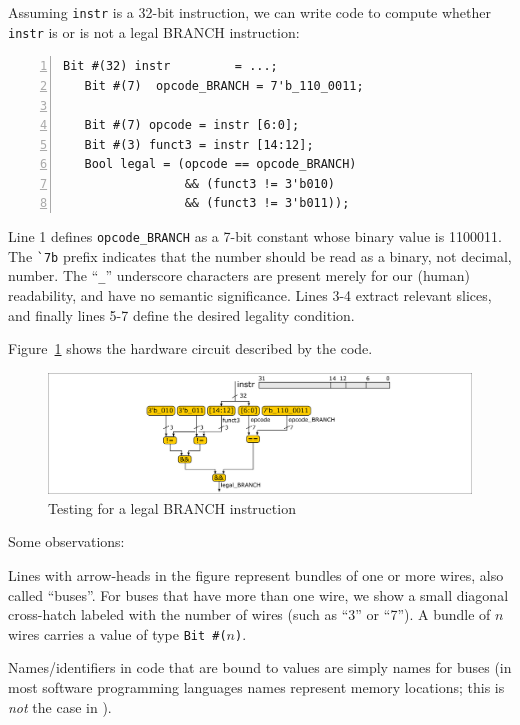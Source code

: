 Assuming \verb|instr| is a 32-bit instruction, we can write {\BSV} code
to compute whether \verb|instr| is or is not a legal BRANCH
instruction:

{\footnotesize
\begin{Verbatim}[frame=single, numbers=left]
   Bit #(32) instr         = ...;
   Bit #(7)  opcode_BRANCH = 7'b_110_0011;

   Bit #(7) opcode = instr [6:0];
   Bit #(3) funct3 = instr [14:12];
   Bool legal = (opcode == opcode_BRANCH)
                 && (funct3 != 3'b010)
                 && (funct3 != 3'b011));
\end{Verbatim}
}

Line 1 defines \verb|opcode_BRANCH| as a 7-bit constant whose binary
value is 1100011.  The \verb|`7b| prefix indicates that the number
should be read as a binary, not decimal, number.  The ``\verb|_|''
underscore characters are present merely for our (human) readability,
and have no semantic significance.  Lines 3-4 extract relevant slices,
and finally lines 5-7 define the desired legality condition.

Figure~\ref{Fig_Combo_Is_Legal_BRANCH} shows the hardware circuit described by the code.
\begin{figure}[htbp]
  \centerline{\includegraphics[width=6in,angle=0]{Figures/Fig_Combo_Is_Legal_BRANCH}}
  \caption{\label{Fig_Combo_Is_Legal_BRANCH}Testing for a legal BRANCH instruction}
\end{figure}
Some observations:
\begin{tightlist}

 \item Lines with arrow-heads in the figure represent bundles of one
   or more wires, also called ``buses''.  For buses that have more
   than one wire, we show a small diagonal cross-hatch labeled with
   the number of wires (such as ``3'' or ``7'').  A bundle of $n$
   wires carries a value of type {\tt Bit~\#($n$)}.

 \item Names/identifiers in {\BSV} code that are bound to values are
   simply names for buses (in most software programming languages
   names represent memory locations; this is \emph{not} the case in
   {\BSV}).

\end{tightlist}


